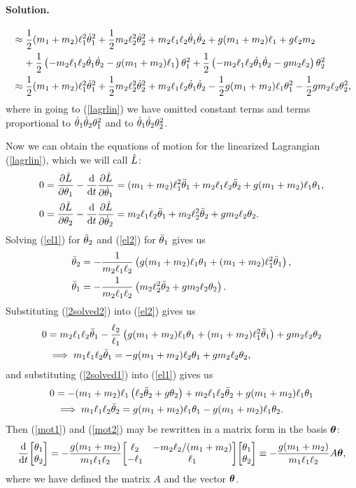 \documentclass[11pt]{article}
\newcommand{\refeq}[1]{(\ref{#1})}
\newenvironment{solution}
{
    \paragraph{Solution.}
    \ignorespaces
}
{
    \bigskip
}
\begin{document}
\begin{solution}
\begin{align}
		&\approx \frac{1}{2} (m_1 + m_2) \ell_1^2 \dot{\theta}_1^2 + \frac{1}{2} m_2 \ell_2^2 \dot{\theta}_2^2 + m_2 \ell_1 \ell_2 \dot{\theta}_1 \dot{\theta}_2 + g (m_1 + m_2) \ell_1 + g \ell_2 m_2 \notag \\
		&\phantom{\approx\ } + \frac{1}{2} \left( -m_2 \ell_1 \ell_2 \dot{\theta}_1 \dot{\theta}_2 - g (m_1 + m_2) \ell_1 \right) \theta_1^2 + \frac{1}{2} \left( -m_2 \ell_1 \ell_2 \dot{\theta}_1 \dot{\theta}_2 - g m_2 \ell_2 \right) \theta_2^2 \\
		&\approx \frac{1}{2} (m_1 + m_2) \ell_1^2 \dot{\theta}_1^2 + \frac{1}{2} m_2 \ell_2^2 \dot{\theta}_2^2 + m_2 \ell_1 \ell_2 \dot{\theta}_1 \dot{\theta}_2 - \frac{1}{2} g (m_1 + m_2) \ell_1 \theta_1^2 - \frac{1}{2} g m_2 \ell_2 \theta_2^2, \label{lagrlin}
	\end{align}
	where in going to \refeq{lagrlin} we have omitted constant terms and terms proportional to $\dot{\theta}_1 \dot{\theta}_2 \theta_1^2$ and to $\dot{\theta}_1 \dot{\theta}_2 \theta_2^2$.
	
	Now we can obtain the equations of motion for the linearized Lagrangian \refeq{lagrlin}, which we will call $\hat{L}$:
	\begin{align}
		0 &= \pdv{\hat{L}}{\theta_1} - \dv{}{t} \pdv{\hat{L}}{\dot{\theta}_1} = (m_1 + m_2) \ell_1^2 \ddot{\theta}_1 + m_2 \ell_1 \ell_2 \ddot{\theta}_2 + g (m_1 + m_2) \ell_1 \theta_1, \label{el1} \\
		0 &= \pdv{\hat{L}}{\theta_2} - \dv{}{t} \pdv{\hat{L}}{\dot{\theta}_2} = m_2 \ell_1 \ell_2 \ddot{\theta}_1 + m_2 \ell_2^2 \ddot{\theta}_2 + g m_2 \ell_2 \theta_2. \label{el2}
	\end{align}
	Solving \refeq{el1} for $\ddot{\theta}_2$ and \refeq{el2} for $\ddot{\theta}_1$ gives us
	\begin{align}
		\ddot{\theta}_2 &= -\frac{1}{m_2 \ell_1 \ell_2} \left( g (m_1 + m_2) \ell_1 \theta_1 + (m_1 + m_2) \ell_1^2 \ddot{\theta}_1 \right), \label{2solved2} \\
		\ddot{\theta}_1 &= -\frac{1}{m_2 \ell_1 \ell_2} \left( m_2 \ell_2^2 \ddot{\theta}_2 + g m_2 \ell_2 \theta_2 \right) \label{2solved1}.
	\end{align}
	Substituting \refeq{2solved2} into \refeq{el2} gives us
	\begin{align}
		0 &= m_2 \ell_1 \ell_2 \ddot{\theta}_1 - \frac{\ell_2}{\ell_1} \left( g (m_1 + m_2) \ell_1 \theta_1 + (m_1 + m_2) \ell_1^2 \ddot{\theta}_1 \right) + g m_2 \ell_2 \theta_2 \\
		&\implies m_1 \ell_1 \ell_2 \ddot{\theta}_1 = -g (m_1 + m_2) \ell_2 \theta_1 + g m_2 \ell_2 \theta_2, \label{mot1}
	\end{align}
	and substituting \refeq{2solved1} into \refeq{el1} gives us
	\begin{align}
		0 &= -(m_1 + m_2) \ell_1 \left( \ell_2 \ddot{\theta}_2 + g \theta_2 \right) + m_2 \ell_1 \ell_2 \ddot{\theta}_2 + g (m_1 + m_2) \ell_1 \theta_1 \\
		&\implies m_1 \ell_1 \ell_2 \ddot{\theta}_2 = g (m_1 + m_2) \ell_1 \theta_1 - g (m_1 + m_2) \ell_1 \theta_2. \label{mot2}
	\end{align}
	Then \refeq{mot1} and \refeq{mot2} may be rewritten in a matrix form in the basis $\boldsymbol{\theta}$:
	\begin{equation}
		\dv{}{t} \mqty[ \thq \\ \thw ] = -\frac{g (\mq + \mw)}{\mq \elq \elw} \mqty[ \elw & -\mw \elw / (\mq + \mw) \\ -\elq & \elq ] \mqty[ \thq \\ \thw ] \equiv -\frac{g (\mq + \mw)}{\mq \elq \elw} A \vth,
	\end{equation}
	where we have defined the matrix $A$ and the vector $\boldsymbol{\theta}$.
	

\end{solution}
\end{document}
